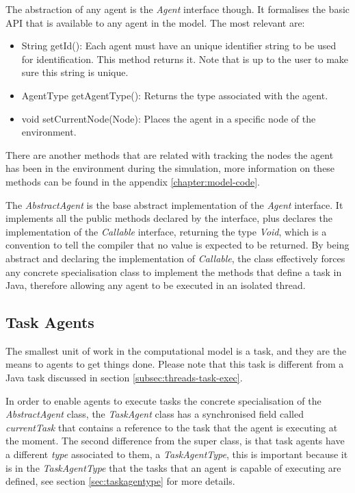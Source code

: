 The abstraction of any agent is the \emph{Agent} interface though. It formalises the basic API that is available to any agent in the model. The most relevant are:

\begin{itemize}
  \item String getId(): Each agent must have an unique identifier string to be used for identification. This method returns it. Note that is up to the user to make sure this string is unique.
  
  \item AgentType getAgentType(): Returns the type associated with the agent.
  
  \item void setCurrentNode(Node): Places the agent in a specific node of the environment.
\end{itemize}

There are another methods that are related with tracking the nodes the agent has been in the environment during the simulation, more information on these methods can be found in the appendix \ref{chapter:model-code}.

The \emph{AbstractAgent} is the base abstract implementation of the \emph{Agent} interface. It implements all the public methods declared by the interface, plus declares the implementation of the \emph{Callable} interface, returning the type \emph{Void}, which is a convention to tell the compiler that no value is expected to be returned. By being abstract and declaring the implementation of \emph{Callable}, the class effectively forces any concrete specialisation class to implement the methods that define a task in Java, therefore allowing any agent to be executed in an isolated thread.

\subsection{Task Agents}

The smallest unit of work in the computational model is a task, and they are the means to agents to get things done. Please note that this task is different from a Java task discussed in section \ref{subsec:threads-task-exec}. 

In order to enable agents to execute tasks the concrete specialisation of the \emph{AbstractAgent} class, the \emph{TaskAgent} class has a synchronised field called \emph{currentTask} that contains a reference to the task that the agent is executing at the moment. The second difference from the super class, is that task agents have a different \emph{type} associated to them, a \emph{TaskAgentType}, this is important because it is in the \emph{TaskAgentType} that the tasks that an agent is capable of executing are defined, see section \ref{sec:taskagentype} for more details.

